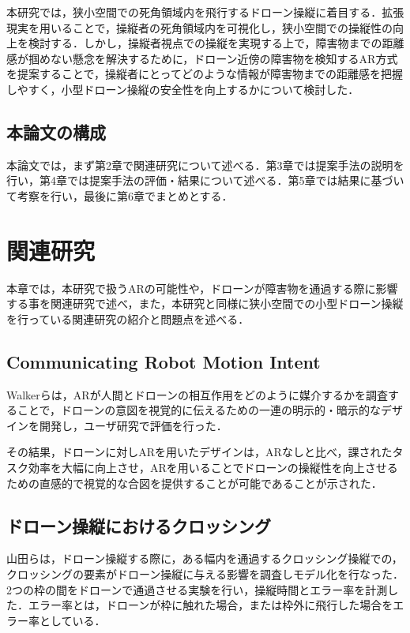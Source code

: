 \documentclass
[a4paper,11pt]{jreport}
\begin{document}
本研究では，狭小空間での死角領域内を飛行するドローン操縦に着目する．拡張現実を用いることで，操縦者の死角領域内を可視化し，狭小空間での操縦性の向上を検討する．しかし，操縦者視点での操縦を実現する上で，障害物までの距離感が掴めない懸念を解決するために，ドローン近傍の障害物を検知するAR方式を提案することで，操縦者にとってどのような情報が障害物までの距離感を把握しやすく，小型ドローン操縦の安全性を向上するかについて検討した．

\section{本論文の構成}
本論文では，まず第2章で関連研究について述べる．第3章では提案手法の説明を行い，第4章では提案手法の評価・結果について述べる．第5章では結果に基づいて考察を行い，最後に第6章でまとめとする．


\chapter{関連研究}
本章では，本研究で扱うARの可能性や，ドローンが障害物を通過する際に影響する事を関連研究で述べ，また，本研究と同様に狭小空間での小型ドローン操縦を行っている関連研究の紹介と問題点を述べる．

\section{Communicating Robot Motion Intent}
Walkerらは，ARが人間とドローンの相互作用をどのように媒介するかを調査することで，ドローンの意図を視覚的に伝えるための一連の明示的・暗示的なデザインを開発し，ユーザ研究で評価を行った\cite{ARinterface}．

その結果，ドローンに対しARを用いたデザインは，ARなしと比べ，課されたタスク効率を大幅に向上させ，ARを用いることでドローンの操縦性を向上させるための直感的で視覚的な合図を提供することが可能であることが示された．

\section{ドローン操縦におけるクロッシング}
山田らは，ドローン操縦する際に，ある幅内を通過するクロッシング操縦での，クロッシングの要素がドローン操縦に与える影響を調査しモデル化を行なった\cite{crossing}．2つの枠の間をドローンで通過させる実験を行い，操縦時間とエラー率を計測した．エラー率とは，ドローンが枠に触れた場合，または枠外に飛行した場合をエラー率としている．
\end{document}
